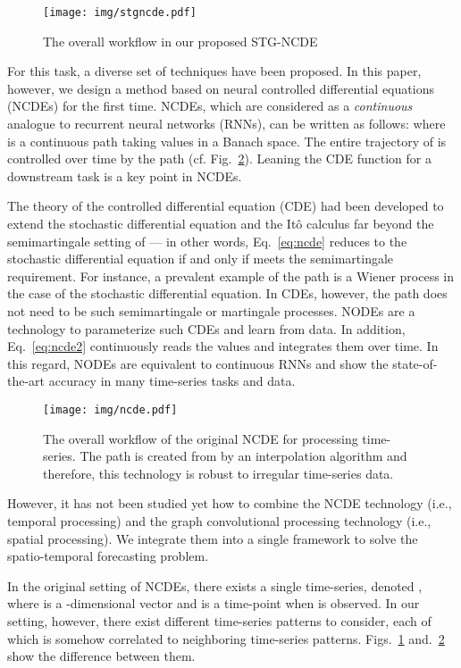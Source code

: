 \documentclass[letterpaper]{article} \usepackage{aaai22}  \usepackage{times}  \usepackage{helvet}  \usepackage{courier}  \usepackage[hyphens]{url}  \usepackage{graphicx} \urlstyle{rm} \def\UrlFont{\rm}  \usepackage{natbib}  \usepackage{caption} \DeclareCaptionStyle{ruled}{labelfont=normalfont,labelsep=colon,strut=off} \frenchspacing  \setlength{\pdfpagewidth}{8.5in}  \setlength{\pdfpageheight}{11in}  \usepackage{stfloats}
\begin{document}
\begin{figure}[t]
    \centering
    \texttt{[image: img/stgncde.pdf]}
    \caption{The overall workflow in our proposed STG-NCDE}
    \label{fig:stgncde}
\end{figure}

For this task, a diverse set of techniques have been proposed. In this paper, however, we design a method based on neural controlled differential equations (NCDEs) for the first time. NCDEs, which are considered as a \emph{continuous} analogue to recurrent neural networks (RNNs), can be written as follows:
where  is a continuous path taking values in a Banach space. The entire trajectory of  is controlled over time by the path  (cf. Fig.~\ref{fig:ncde}). Leaning the CDE function  for a downstream task is a key point in NCDEs.

The theory of the controlled differential equation (CDE) had been developed to extend the stochastic differential equation and the It\^{o} calculus far beyond the semimartingale setting of  --- in other words, Eq.~\eqref{eq:ncde} reduces to the stochastic differential equation if and only if  meets the semimartingale requirement. For instance, a prevalent example of the path  is a Wiener process in the case of the stochastic differential equation. In CDEs, however, the path  does not need to be such semimartingale or martingale processes. NODEs are a technology to parameterize such CDEs and learn from data. In addition, Eq.~\eqref{eq:ncde2} continuously reads the values  and integrates them over time. In this regard, NODEs are equivalent to continuous RNNs and show the state-of-the-art accuracy in many time-series tasks and data.



\begin{figure}[t]
    \centering
    \texttt{[image: img/ncde.pdf]}
    \caption{The overall workflow of the original NCDE for processing time-series. The path  is created from  by an interpolation algorithm and therefore, this technology is robust to irregular time-series data.}
    \label{fig:ncde}
\end{figure}

However, it has not been studied yet how to combine the NCDE technology (i.e., temporal processing) and the graph convolutional processing technology (i.e., spatial processing). We integrate them into a single framework to solve the spatio-temporal forecasting problem.

In the original setting of NCDEs, there exists a single time-series, denoted , where  is a -dimensional vector and  is a time-point when  is observed. In our setting, however, there exist  different time-series patterns to consider, each of which is somehow correlated to neighboring time-series patterns. Figs.~\ref{fig:stgncde} and.~\ref{fig:ncde} show the difference between them.
\end{document}
